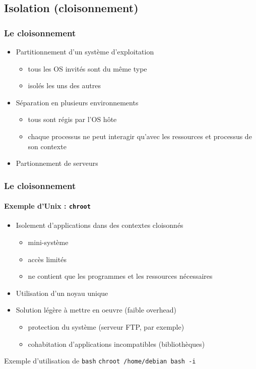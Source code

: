 \subsection{Isolation (cloisonnement)}

\begin{frame}
\frametitle{Le cloisonnement}
\begin{itemize}
\item <1->Partitionnement d’un système d'exploitation
\begin{itemize}
  \item tous les OS invités sont du même type
  \item isolés les uns des autres
\end{itemize}
\item <2->Séparation en plusieurs environnements
\begin{itemize}
\item tous sont régis par l'OS hôte
\item chaque processus ne peut interagir qu'avec les ressources et processus de son contexte
\end{itemize}
\item <3>Partionnement de serveurs
\end{itemize}
\end{frame}

\begin{frame}
\frametitle{Le cloisonnement}
\framesubtitle{Exemple d'Unix : \texttt{chroot}}
\begin{itemize}
\item Isolement d'applications dans des contextes cloisonnés
\begin{itemize}
\item mini-système
\item accès limités
\item ne contient que les programmes et les ressources nécessaires
\end{itemize}
\item Utilisation d'un noyau unique
\item Solution légère à mettre en oeuvre (faible overhead)
\begin{itemize}
\item protection du système (serveur FTP, par exemple)
\item cohabitation d'applications incompatibles (bibliothèques)
\end{itemize}
\end{itemize}
\begin{exampleblock}{Exemple d'utilisation de \texttt{bash}}
\texttt{chroot /home/debian bash -i}
\end{exampleblock}
\end{frame}

